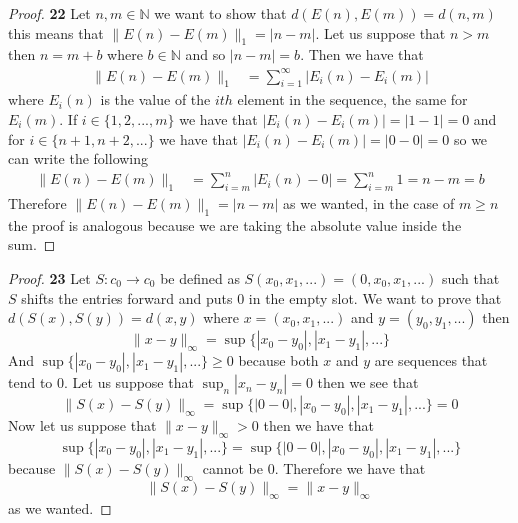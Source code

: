 \documentclass[11pt]{article}
\newcommand{\N}{\mathbb{N}}
\theoremstyle{definition}
\begin{document}
    \begin{proof}{\textbf{22}}
        Let $n,m \in \N$ we want to show that $d(E(n), E(m)) = d(n,m)$ this
        means that $\|E(n) - E(m)\|_1 = |n-m|$. Let us suppose that $n > m$
        then $n = m + b$ where $b \in \N$ and so $|n - m| = b$.
        Then we have that
        \begin{align*}
            \|E(n) - E(m)\|_1 &= \sum_{i=1}^{\infty} |E_i(n) - E_i(m)|
        \end{align*}
        where $E_i(n)$ is the value of the $ith$ element in the sequence, the
        same for $E_i(m)$. If $i \in \{1, 2, ..., m \}$ we have that
        $|E_i(n) - E_i(m)| =  |1 - 1| = 0$ and for $i \in \{n +1, n+2, ...\}$
        we have that $|E_i(n) - E_i(m)| =  |0 - 0| = 0$ so we can write the
        following
        \begin{align*}
            \|E(n) - E(m)\|_1 &= \sum_{i=m}^{n} |E_i(n) - 0|
                = \sum_{i=m}^{n} 1 = n - m = b
        \end{align*}
        Therefore $\|E(n) - E(m)\|_1 = |n-m|$ as we wanted, in the case of
        $m \geq n$ the proof is analogous because we are taking the absolute
        value inside the sum.
    \end{proof}
    \begin{proof}{\textbf{23}}
        Let $S:c_0 \to c_0$ be defined as $S(x_0, x_1, ...) = (0, x_0, x_1, ...)$
        such that $S$ shifts the entries forward and puts $0$ in the empty slot.
        We want to prove that $d(S(x), S(y)) = d(x,y)$ where $x = (x_0, x_1, ...)$
        and $y = (y_0, y_1, ...)$ then
        $$\|x - y\|_\infty = \sup \{|x_0 - y_0|, |x_1 - y_1|, ...\}$$
        And $\sup \{|x_0 - y_0|, |x_1 - y_1|, ...\} \geq 0$ because both $x$
        and $y$ are sequences that tend to $0$. Let us suppose that
        $\sup_n |x_n - y_n| = 0$ then we see that
        $$\|S(x) - S(y)\|_\infty = \sup \{|0 - 0|, |x_0 - y_0|, |x_1 - y_1|, ...\}
        = 0$$
        Now let us suppose that $\|x - y\|_\infty > 0$ then we have that
        $$\sup \{|x_0 - y_0|, |x_1 - y_1|, ...\} = \sup \{|0-0|, |x_0 - y_0|, |x_1 - y_1|, ...\}$$
        because $\|S(x) - S(y)\|_\infty$ cannot be $0$. Therefore we have that
        $$\|S(x)-S(y)\|_\infty = \|x -y\|_\infty$$
        as we wanted.

    \end{proof}
\end{document}
